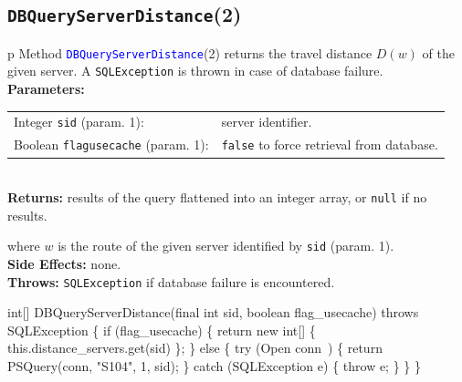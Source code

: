 \subsection{\texttt{DBQueryServerDistance}(2)}
\begin{tabular}{p{\textwidth}}
\toprule
{}
Method \textcolor{blue}{{\tt{}\protect{}DBQueryServerDistance}}(2) returns the
travel distance $D(w)$ of the given server.
A {\tt{}SQLException} is thrown in case of database failure.\\
\midrule
\textbf{Parameters:} \\
\begin{tabular}{lp{116mm}}
Integer {\tt{}sid} (param. 1):&server identifier.\\
Boolean {\tt{}flag{\char95}usecache} (param. 1):&{\tt{}false} to force retrieval from database.
\end{tabular}\\
\textbf{Returns:} results of the query flattened into an integer array,
or {\tt{}null} if no results.


where $w$ is the route of the given server identified by {\tt{}sid} (param. 1).\\
\textbf{Side Effects:} none.\\
\textbf{Throws:} {\tt{}SQLException} if database failure is encountered.\\
\bottomrule
\end{tabular}
\nwenddocs{}\endmoddef{}
int[] DBQueryServerDistance(final int sid, boolean flag_usecache) throws SQLException \{
  if (flag_usecache) \{
    return new int[] \{ this.distance_servers.get(sid) \};
  \} else \{
    try (\LA{}Open \code{}conn\edoc{}~{\nwtagstyle{}}\RA{}) \{
      return PSQuery(conn, "S104", 1, sid);
    \} catch (SQLException e) \{
      throw e;
    \}
  \}
\}
\eatline
{}\nwendcode{}\endmoddef{}
